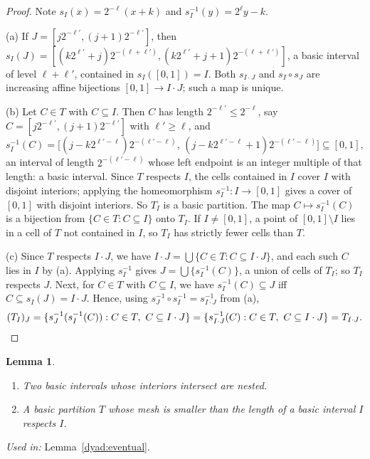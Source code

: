 \documentclass[11pt]{article}
\newtheorem{lemma}[theorem]{Lemma}
\theoremstyle{definition}
\numberwithin{equation}{section}
\begin{document}
\begin{proof}
Note \(s_I(x)=2^{-\ell}(x+k)\) and \(s_I^{-1}(y)=2^{\ell}y-k\).

(a) If \(J=[j2^{-\ell'},(j+1)2^{-\ell'}]\), then
\(s_I(J)=[(k2^{\ell'}+j)2^{-(\ell+\ell')},(k2^{\ell'}+j+1)2^{-(\ell+\ell')}]\),
a basic interval of level \(\ell+\ell'\), contained in \(s_I([0,1])=I\).
Both \(s_{I\cdot J}\) and \(s_I\circ s_J\) are increasing affine
bijections \([0,1]\to I\cdot J\); such a map is unique.

(b) Let \(C\in T\) with \(C\subseteq I\). Then \(C\) has length
\(2^{-\ell'}\le 2^{-\ell}\), say \(C=[j2^{-\ell'},(j+1)2^{-\ell'}]\) with
\(\ell'\ge\ell\), and
\[
  s_I^{-1}(C)=\bigl[(j-k2^{\ell'-\ell})2^{-(\ell'-\ell)},\,
                    (j-k2^{\ell'-\ell}+1)2^{-(\ell'-\ell)}\bigr]
  \subseteq[0,1],
\]
an interval of length \(2^{-(\ell'-\ell)}\) whose left endpoint is an
integer multiple of that length: a basic interval. Since \(T\) respects
\(I\), the cells contained in \(I\) cover \(I\) with disjoint interiors;
applying the homeomorphism \(s_I^{-1}:I\to[0,1]\) gives a cover of
\([0,1]\) with disjoint interiors. So \(T_I\) is a basic partition.
The map \(C\mapsto s_I^{-1}(C)\) is a bijection from
\(\{C\in T:C\subseteq I\}\) onto \(T_I\). If \(I\ne[0,1]\), a point of
\([0,1]\setminus I\) lies in a cell of \(T\) not contained in \(I\), so
\(T_I\) has strictly fewer cells than \(T\).

(c) Since \(T\) respects \(I\cdot J\), we have
\(I\cdot J=\bigcup\{C\in T:C\subseteq I\cdot J\}\), and each such \(C\)
lies in \(I\) by (a). Applying \(s_I^{-1}\) gives
\(J=\bigcup\{s_I^{-1}(C)\}\), a union of cells of \(T_I\); so \(T_I\)
respects \(J\). Next, for \(C\in T\) with \(C\subseteq I\), we have
\(s_I^{-1}(C)\subseteq J\) iff \(C\subseteq s_I(J)=I\cdot J\). Hence, using
\(s_J^{-1}\circ s_I^{-1}=s_{I\cdot J}^{-1}\) from (a),
\[
  (T_I)_J=\{s_J^{-1}(s_I^{-1}(C)):C\in T,\ C\subseteq I\cdot J\}
         =\{s_{I\cdot J}^{-1}(C):C\in T,\ C\subseteq I\cdot J\}
         =T_{I\cdot J}.\qedhere
\]
\end{proof}

\begin{lemma}\label{dyad:nested}
\begin{enumerate}[label=(\alph*)]
\item Two basic intervals whose interiors intersect are nested.
\item A basic partition \(T\) whose mesh is smaller than the length of a
basic interval \(I\) respects \(I\).
\end{enumerate}
\end{lemma}
\noindent\emph{Used in:} Lemma~\ref{dyad:eventual}.
\end{document}

